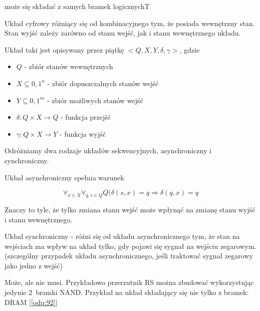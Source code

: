 {może się składać z samych bramek logicznych}{T}
{
Układ cyfrowy różniący się od kombinacyjnego tym, że posiada wewnętrzny stan. Stan wyjść zależy zarówno od stanu wejść, jak i stanu wewnętrznego układu.

Układ taki jest opisywany przez piątkę $<Q, X, Y, \delta, \gamma>$, gdzie

\begin{itemize}
\item $Q$ - zbiór stanów wewnętrznych
\item $X \subseteq {0,1}^n$ - zbiór dopuszczalnych stanów wejść
\item $Y \subseteq {0,1}^m$ - zbiór możliwych stanów wejść
\item $\delta:Q\times X\rightarrow Q$ - funkcja przejść
\item $\gamma:Q\times X\rightarrow Y$ - funkcja wyjść
\end{itemize}

Odróżniamy dwa rodzaje układów sekwencyjnych, asynchroniczny i synchroniczny.

Układ asynchroniczny spełnia warunek

\begin{equation}
\label{sekasy}
\forall_{x\in X}\forall_{q,s\in Q}Q(\delta(s,x)=q\Rightarrow\delta(q,x)=q
\end{equation}

Znaczy to tyle, że tylko zmiana stanu wejść może wpłynąć na zmianę stanu wyjść i stanu wewnętrznego.

Układ synchroniczny - różni się od układu asynchronicznego tym, że stan na wejściach ma wpływ na układ tylko, gdy pojawi się sygnał na wejściu zegarowym. (szczególny przypadek układu asynchronicznego, jeśli traktować sygnał zegarowy jako jedno z wejść)
}
{Może, ale nie musi. Przykładowo przerzutnik RS można zbudować wykorzystując jedynie 2~bramki NAND. Przykład na układ składający się nie tylko z bramek: DRAM [\ref{odp:92}]}
\label{odp:91}


